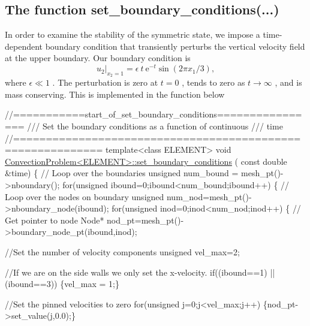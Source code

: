  

\hypertarget{index_set_bound}{}\subsection{The function set\+\_\+boundary\+\_\+conditions(...)}\label{index_set_bound}
In order to examine the stability of the symmetric state, we impose a time-\/dependent boundary condition that transiently perturbs the vertical velocity field at the upper boundary. Our boundary condition is \[ u_{2}\big|_{x_2=1} = \epsilon \ t \ \mbox{e}^{-t} \sin(2\pi x_{1}/3), \] where $ \epsilon \ll 1 $ . The perturbation is zero at $ t=0 $ , tends to zero as $ t\to\infty $ , and is mass conserving. This is implemented in the function below

 
\begin{DoxyCodeInclude}
\textcolor{comment}{//===========start\_of\_set\_boundary\_conditions================}
\textcolor{comment}{/// Set the boundary conditions as a function of continuous }
\textcolor{comment}{}\textcolor{comment}{/// time}
\textcolor{comment}{}\textcolor{comment}{//===========================================================}
\textcolor{keyword}{template}<\textcolor{keyword}{class} ELEMENT>
\textcolor{keywordtype}{void} \hyperlink{classConvectionProblem_a605543718d51f7a77f75a46b48b543d7}{ConvectionProblem<ELEMENT>::set\_boundary\_conditions}
      (
 \textcolor{keyword}{const} \textcolor{keywordtype}{double} &time)
\{
 \textcolor{comment}{// Loop over the boundaries}
 \textcolor{keywordtype}{unsigned} num\_bound = mesh\_pt()->nboundary();
 \textcolor{keywordflow}{for}(\textcolor{keywordtype}{unsigned} ibound=0;ibound<num\_bound;ibound++)
  \{
   \textcolor{comment}{// Loop over the nodes on boundary }
   \textcolor{keywordtype}{unsigned} num\_nod=mesh\_pt()->nboundary\_node(ibound);
   \textcolor{keywordflow}{for}(\textcolor{keywordtype}{unsigned} inod=0;inod<num\_nod;inod++)
    \{
     \textcolor{comment}{// Get pointer to node}
     Node* nod\_pt=mesh\_pt()->boundary\_node\_pt(ibound,inod);

     \textcolor{comment}{//Set the number of velocity components}
     \textcolor{keywordtype}{unsigned} vel\_max=2;

     \textcolor{comment}{//If we are on the side walls we only set the x-velocity.}
     \textcolor{keywordflow}{if}((ibound==1) || (ibound==3)) \{vel\_max = 1;\}

     \textcolor{comment}{//Set the pinned velocities to zero}
     \textcolor{keywordflow}{for}(\textcolor{keywordtype}{unsigned} j=0;j<vel\_max;j++) \{nod\_pt->set\_value(j,0.0);\}


\end{DoxyCodeInclude}
